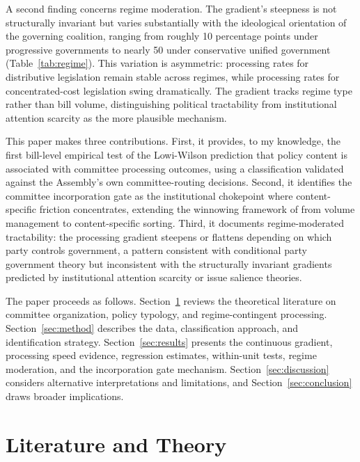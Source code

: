 \documentclass[11pt]{article}
\begin{document}
A second finding concerns regime moderation. The gradient's steepness is not structurally invariant but varies substantially with the ideological orientation of the governing coalition, ranging from roughly 10 percentage points under progressive governments to nearly 50 under conservative unified government (Table~\ref{tab:regime}). This variation is asymmetric: processing rates for distributive legislation remain stable across regimes, while processing rates for concentrated-cost legislation swing dramatically. The gradient tracks regime type rather than bill volume, distinguishing political tractability from institutional attention scarcity as the more plausible mechanism.

This paper makes three contributions. First, it provides, to my knowledge, the first bill-level empirical test of the Lowi-Wilson prediction that policy content is associated with committee processing outcomes, using a classification validated against the Assembly's own committee-routing decisions. Second, it identifies the committee incorporation gate as the institutional chokepoint where content-specific friction concentrates, extending the winnowing framework of \citet{krutz2005} from volume management to content-specific sorting. Third, it documents regime-moderated tractability: the processing gradient steepens or flattens depending on which party controls government, a pattern consistent with conditional party government theory \citep{aldrich2001} but inconsistent with the structurally invariant gradients predicted by institutional attention scarcity \citep{jones2004} or issue salience \citep{culpepper2011} theories.

The paper proceeds as follows. Section~\ref{sec:lit} reviews the theoretical literature on committee organization, policy typology, and regime-contingent processing. Section~\ref{sec:method} describes the data, classification approach, and identification strategy. Section~\ref{sec:results} presents the continuous gradient, processing speed evidence, regression estimates, within-unit tests, regime moderation, and the incorporation gate mechanism. Section~\ref{sec:discussion} considers alternative interpretations and limitations, and Section~\ref{sec:conclusion} draws broader implications.



\section{Literature and Theory}
\label{sec:lit}
\end{document}
